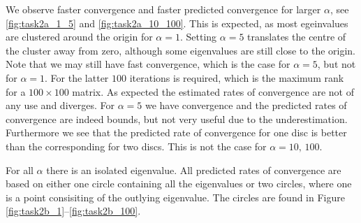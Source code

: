 We observe faster convergence and faster predicted convergence for larger $\alpha$, see \eqref{fig:task2a_1_5} and \eqref{fig:task2a_10_100}. This is expected, as most egeinvalues are clustered around the origin for $\alpha = 1$. Setting $\alpha = 5$ translates the centre of the cluster away from zero, although some eigenvalues are still close to the origin. Note that we may still have fast convergence, which is the case for $\alpha = 5$, but not for $\alpha = 1$. For the latter $100$ iterations is required, which is the maximum rank for a $100\times 100$ matrix. As expected the estimated rates of convergence are not of any use and diverges. For $\alpha = 5$ we have convergence and the predicted rates of convergence are indeed bounds, but not very useful due to the underestimation. Furthermore we see that the predicted rate of convergence for one disc is better than the corresponding for two discs. This is not the case for
$\alpha = 10,\,100$.

For all $\alpha$ there is an isolated eigenvalue. All predicted rates of convergence are based on either one circle containing all the eigenvalues or two circles, where one is a point consisiting of the outlying eigenvalue. The circles are found in Figure \ref{fig:task2b_1}--\ref{fig:task2b_100}. \\



